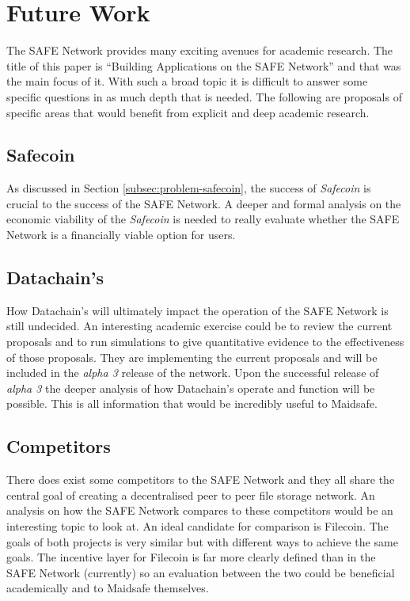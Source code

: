 \section{Future Work}

The SAFE Network provides many exciting avenues for academic research. The title of this paper is ``Building Applications on the SAFE Network'' and that was the main focus of it. With such a broad topic it is difficult to answer some specific questions in as much depth that is needed. The following are proposals of specific areas that would benefit from explicit  and deep academic research.

\subsection{Safecoin}

As discussed in Section \ref{subsec:problem-safecoin}, the success of \textit{Safecoin} is crucial to the success of the SAFE Network. A deeper and formal analysis on the economic viability of the \textit{Safecoin} is needed to really evaluate whether the SAFE Network is a financially viable option for users.

\subsection{Datachain's}

How Datachain's will ultimately impact the operation of the SAFE Network is still undecided. An interesting academic exercise could be to review the current proposals and to run simulations to give quantitative evidence to the effectiveness of those proposals. They are implementing the current proposals and will be included in the \textit{alpha 3} release of the network. Upon the successful release of \textit{alpha 3} the deeper analysis of how Datachain's operate and function will be possible. This is all information that would be incredibly useful to Maidsafe.

\subsection{Competitors}

There does exist some competitors to the SAFE Network and they all share the central goal of creating a decentralised peer to peer file storage network. An analysis on how the SAFE Network compares to these competitors would be an interesting topic to look at. An ideal candidate for comparison is Filecoin\cite{filecoin}. The goals of both projects is very similar but with different ways to achieve the same goals. The incentive layer for Filecoin is far more clearly defined than in the SAFE Network (currently) so an evaluation between the two could be beneficial academically and to Maidsafe themselves.




